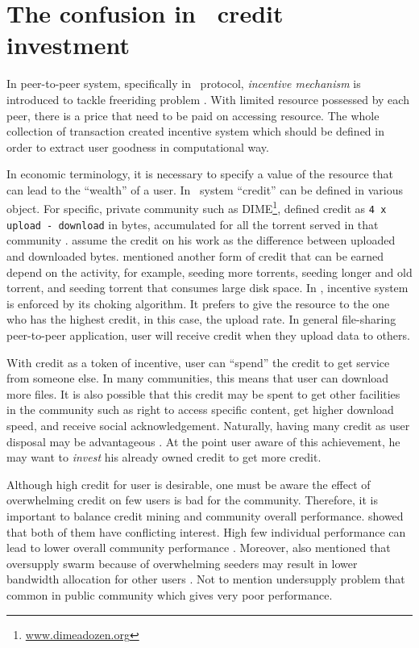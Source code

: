 \section{The confusion in \bt~credit investment}
In peer-to-peer system, specifically in \bt~protocol, \textit{incentive mechanism} is introduced to tackle freeriding problem \cite{2003:bittorrent:cohen}. With limited resource possessed by each peer, there is a price that need to be paid on accessing resource. The whole collection of transaction created incentive system which should be defined in order to extract user goodness in computational way.

In economic terminology, it is necessary to specify a value of the resource that can lead to the ``wealth'' of a user. In \bt~system ``credit'' can be defined in various object. For specific, private community such as DIME\footnote{\url{www.dimeadozen.org}}, \citeauthor{2012:economicbt:kash}  defined credit as \texttt{4 x upload - download} in bytes, accumulated for all the torrent served in that community \cite{2012:economicbt:kash}. \citeauthor{2015:creditmining:capota} assume the credit on his work as the difference between uploaded and downloaded bytes. \citeauthor{2014:sustainabilitytorrent:chen} mentioned another form of credit that can be earned depend on the activity, for example, seeding more torrents, seeding longer and old torrent, and seeding torrent that consumes large disk space\cite{2014:sustainabilitytorrent:chen}. In \bt, incentive system is enforced by its choking algorithm. It prefers to give the resource to the one who has the highest credit, in this case, the upload rate. In general file-sharing peer-to-peer application, user will receive credit when they upload data to others.

With credit as a token of incentive, user can ``spend'' the credit to get service from someone else. In many communities, this means that user can download more files. It is also possible that this credit may be spent to get other facilities in the community such as right to access specific content, get higher download speed, and receive social acknowledgement. Naturally, having many credit as user disposal may be advantageous \cite{2014:sustainabilitytorrent:chen}. At the point user aware of this achievement, he may want to \textit{invest} his already owned credit to get more credit.

Although high credit for user is desirable, one must be aware the effect of overwhelming credit on few users is bad for the community. Therefore, it is important to balance credit mining and community overall performance. \citeauthor{2015:sustainabilitypt:vinko} showed that both of them have conflicting interest. High few individual performance can lead to lower overall community performance \cite{2015:sustainabilitypt:vinko}. Moreover, \citeauthor{2013:survivepriv:jia} also mentioned that oversupply swarm because of overwhelming seeders may result in lower bandwidth allocation for other users \cite{2013:survivepriv:jia}. Not to mention undersupply problem that common in public community which gives very poor performance.

